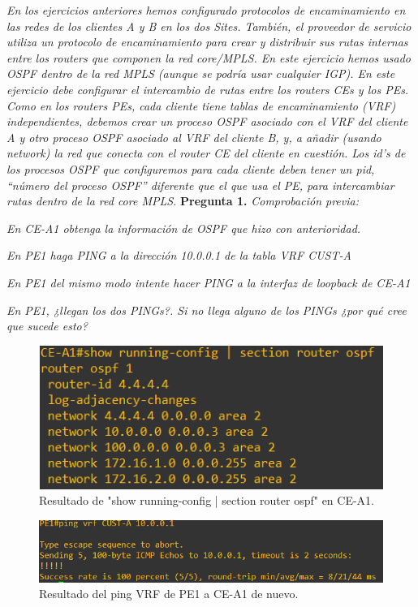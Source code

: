 \documentclass[a4paper, 12pt]{report}
\begin{document}
\textit{En los ejercicios anteriores hemos configurado protocolos de encaminamiento en las redes de los
clientes A y B en los dos Sites. También, el proveedor de servicio utiliza un protocolo de
encaminamiento para crear y distribuir sus rutas internas entre los routers que componen la red
core/MPLS. En este ejercicio hemos usado OSPF dentro de la red MPLS (aunque se podría usar
cualquier IGP).
En este ejercicio debe configurar el intercambio de rutas entre los routers CEs y los PEs.
Como en los routers PEs, cada cliente tiene tablas de encaminamiento (VRF) independientes,
debemos crear un proceso OSPF asociado con el VRF del cliente A y otro proceso OSPF
asociado al VRF del cliente B, y, a añadir (usando network) la red que conecta con el router CE
del cliente en cuestión. Los id’s de los procesos OSPF que configuremos para cada cliente
deben tener un pid, “número del proceso OSPF” diferente que el que usa el PE, para
intercambiar rutas dentro de la red core MPLS.}
\newpage
\textbf{Pregunta 1.}
\textit{
	Comprobación previa:
}

\textit{
	En CE-A1 obtenga la información de OSPF que hizo con anterioridad.
}

\textit{En PE1 haga PING a la dirección 10.0.0.1 de la tabla VRF CUST-A}

\textit{En PE1 del mismo modo intente hacer PING a la interfaz de loopback de CE-A1}

\textit{En PE1, ¿llegan los dos PINGs?. Si no llega alguno de los PINGs ¿por qué cree que sucede
esto?}

\begin{figure}[H]
	\centering
	\includegraphics[scale=0.7]{ospfconfigcea1.png}
	\caption{Resultado de "show running-config | section router ospf" en CE-A1.}
	\label{fig:ospfconfigcea1}
\end{figure}

\begin{figure}[H]
	\centering
	\includegraphics[scale=0.7]{vrfpingpe1-segundo.png}
	\caption{Resultado del ping VRF de PE1 a CE-A1 de nuevo.}
	\label{fig:vrfpingpe1-segundo}
\end{figure}
\end{document}
